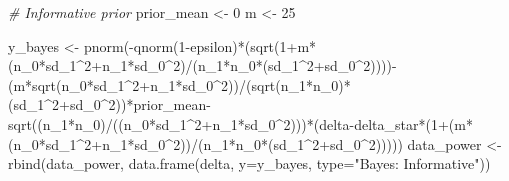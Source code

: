 \documentclass[
]{book}
\newenvironment{Shaded}{\begin{snugshade}}{\end{snugshade}}
\newcommand{\AttributeTok}[1]{\textcolor[rgb]{0.77,0.63,0.00}{#1}}
\newcommand{\CommentTok}[1]{\textcolor[rgb]{0.56,0.35,0.01}{\textit{#1}}}
\newcommand{\DecValTok}[1]{\textcolor[rgb]{0.00,0.00,0.81}{#1}}
\newcommand{\FunctionTok}[1]{\textcolor[rgb]{0.00,0.00,0.00}{#1}}
\newcommand{\NormalTok}[1]{#1}
\newcommand{\OtherTok}[1]{\textcolor[rgb]{0.56,0.35,0.01}{#1}}
\newcommand{\SpecialCharTok}[1]{\textcolor[rgb]{0.00,0.00,0.00}{#1}}
\newcommand{\StringTok}[1]{\textcolor[rgb]{0.31,0.60,0.02}{#1}}
\begin{document}
\begin{Shaded}
\begin{Highlighting}[]
\CommentTok{\# Informative prior}
\NormalTok{prior\_mean }\OtherTok{\textless{}{-}} \DecValTok{0}
\NormalTok{m }\OtherTok{\textless{}{-}} \DecValTok{25}

\NormalTok{y\_bayes }\OtherTok{\textless{}{-}} \FunctionTok{pnorm}\NormalTok{(}\SpecialCharTok{{-}}\FunctionTok{qnorm}\NormalTok{(}\DecValTok{1}\SpecialCharTok{{-}}\NormalTok{epsilon)}\SpecialCharTok{*}\NormalTok{(}\FunctionTok{sqrt}\NormalTok{(}\DecValTok{1}\SpecialCharTok{+}\NormalTok{m}\SpecialCharTok{*}\NormalTok{(n\_0}\SpecialCharTok{*}\NormalTok{sd\_1}\SpecialCharTok{\^{}}\DecValTok{2}\SpecialCharTok{+}\NormalTok{n\_1}\SpecialCharTok{*}\NormalTok{sd\_0}\SpecialCharTok{\^{}}\DecValTok{2}\NormalTok{)}\SpecialCharTok{/}\NormalTok{(n\_1}\SpecialCharTok{*}\NormalTok{n\_0}\SpecialCharTok{*}\NormalTok{(sd\_1}\SpecialCharTok{\^{}}\DecValTok{2}\SpecialCharTok{+}\NormalTok{sd\_0}\SpecialCharTok{\^{}}\DecValTok{2}\NormalTok{))))}\SpecialCharTok{{-}}\NormalTok{(m}\SpecialCharTok{*}\FunctionTok{sqrt}\NormalTok{(n\_0}\SpecialCharTok{*}\NormalTok{sd\_1}\SpecialCharTok{\^{}}\DecValTok{2}\SpecialCharTok{+}\NormalTok{n\_1}\SpecialCharTok{*}\NormalTok{sd\_0}\SpecialCharTok{\^{}}\DecValTok{2}\NormalTok{))}\SpecialCharTok{/}\NormalTok{(}\FunctionTok{sqrt}\NormalTok{(n\_1}\SpecialCharTok{*}\NormalTok{n\_0)}\SpecialCharTok{*}\NormalTok{(sd\_1}\SpecialCharTok{\^{}}\DecValTok{2}\SpecialCharTok{+}\NormalTok{sd\_0}\SpecialCharTok{\^{}}\DecValTok{2}\NormalTok{))}\SpecialCharTok{*}\NormalTok{prior\_mean}\SpecialCharTok{{-}}\FunctionTok{sqrt}\NormalTok{((n\_1}\SpecialCharTok{*}\NormalTok{n\_0)}\SpecialCharTok{/}\NormalTok{((n\_0}\SpecialCharTok{*}\NormalTok{sd\_1}\SpecialCharTok{\^{}}\DecValTok{2}\SpecialCharTok{+}\NormalTok{n\_1}\SpecialCharTok{*}\NormalTok{sd\_0}\SpecialCharTok{\^{}}\DecValTok{2}\NormalTok{)))}\SpecialCharTok{*}\NormalTok{(delta}\SpecialCharTok{{-}}\NormalTok{delta\_star}\SpecialCharTok{*}\NormalTok{(}\DecValTok{1}\SpecialCharTok{+}\NormalTok{(m}\SpecialCharTok{*}\NormalTok{(n\_0}\SpecialCharTok{*}\NormalTok{sd\_1}\SpecialCharTok{\^{}}\DecValTok{2}\SpecialCharTok{+}\NormalTok{n\_1}\SpecialCharTok{*}\NormalTok{sd\_0}\SpecialCharTok{\^{}}\DecValTok{2}\NormalTok{))}\SpecialCharTok{/}\NormalTok{(n\_1}\SpecialCharTok{*}\NormalTok{n\_0}\SpecialCharTok{*}\NormalTok{(sd\_1}\SpecialCharTok{\^{}}\DecValTok{2}\SpecialCharTok{+}\NormalTok{sd\_0}\SpecialCharTok{\^{}}\DecValTok{2}\NormalTok{)))))}
\NormalTok{data\_power }\OtherTok{\textless{}{-}} \FunctionTok{rbind}\NormalTok{(data\_power, }\FunctionTok{data.frame}\NormalTok{(delta, }\AttributeTok{y=}\NormalTok{y\_bayes, }\AttributeTok{type=}\StringTok{"Bayes: Informative"}\NormalTok{))}


\end{Highlighting}
\end{Shaded}
\end{document}
